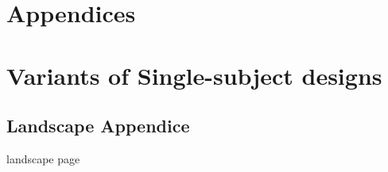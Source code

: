\section*{Appendices}
\section{Variants of Single-subject designs}

\newpage
\begin{landscape}
	\section{Landscape Appendice}
	\label{app:Educational}	
	landscape page
\end{landscape}
